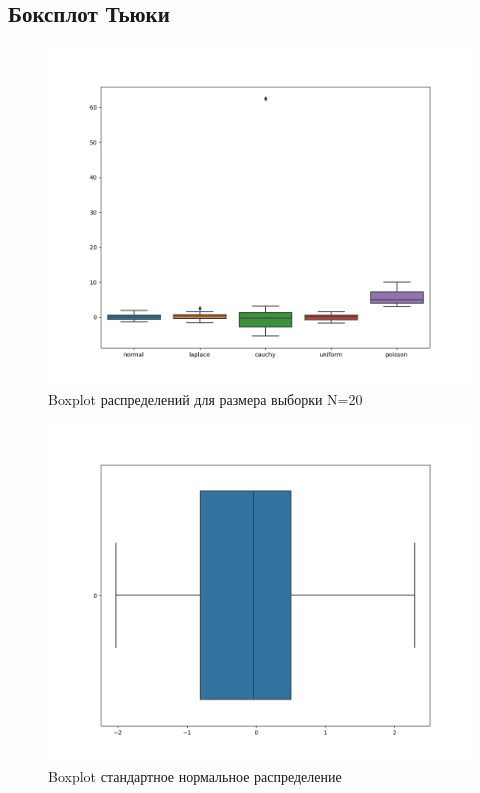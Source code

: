 \documentclass[a4]{article}
\begin{document}
\subsection{Боксплот Тьюки}
\begin{center}
	
	\begin{figure}[H]
		\caption{Boxplot распределений для размера выборки N=20 }
		\includegraphics[width=\textwidth]{Lab3_boxplot_N=20.png}
	\end{figure}
	
	\begin{figure}[H]
		\caption{Boxplot стандартное нормальное распределение }
		\includegraphics[width=\textwidth]{Lab3_boxplot_N=100_normal.png} 
	\end{figure}
	

\end{center}
\end{document}

